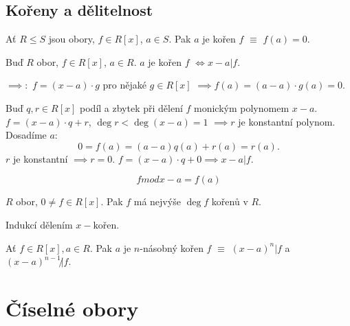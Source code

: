 \documentclass[12pt]{article}                   %
\begin{document}
    \subsection{Kořeny a dělitelnost}
        \begin{definice}
                Ať $R ≤ S$ jsou obory, $f \in R[x]$, $a \in S$. Pak $a$ je kořen $f$ $≡$ $f(a) = 0$.
        \end{definice}

        \begin{tvrzeni}
            Buď $R$ obor, $f \in R[x]$, $a \in R$. $a$ je kořen $f$ $\Leftrightarrow x-a | f$.

            \begin{dukazin}
                $\implies:$ $f = (x-a)·g$ pro nějaké $g \in R[x]$ $\implies f(a) = (a - a)·g(a) = 0$.
            
                Buď $q, r \in R[x]$ podíl a zbytek při dělení $f$ monickým polynomem $x - a$. $f = (x - a)·q + r$, $\deg r < \deg (x - a) = 1$ $\implies r$ je konstantní polynom. Dosadíme $a$:
                $$ 0 = f(a) = (a-a)q(a) + r(a) = r(a). $$ 
                $r$ je konstantní $\implies r = 0$. $f = (x - a)·q + 0 \implies x - a | f$.
            \end{dukazin}
        \end{tvrzeni}

        \begin{pozorovani}
            $$ f mod x-a = f(a) $$ 
        \end{pozorovani}

        \begin{veta}
            $R$ obor, $0 ≠ f \in R[x]$.  Pak $f$ má nejvýše $\deg f$ kořenů v $R$.

            \begin{dukazin}
                Indukcí dělením $x - \text{kořen}$.
            \end{dukazin}
        \end{veta}

        \begin{definice}
            Ať $f \in R[x], a \in R$. Pak $a$ je $n$-násobný kořen $f$ $≡$ $(x - a)^n | f$ a $(x - a)^{n-1} \not| f$.
        \end{definice}

\section{Číselné obory}
\end{document}
